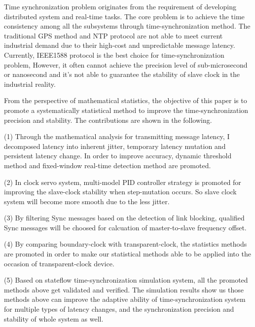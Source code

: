\begin{englishabstract}

Time synchronization problem originates from the requirement of developing distributed system and real-time tasks. The core problem is to achieve the time consistency among all the subsystems through time-synchronization method. The traditional GPS method and NTP protocol are not able to meet current industrial demand due to their high-cost and unpredictable message latency. Currently, IEEE1588 protocol is the best choice for time-synchronization problem, However, it often cannot achieve the precision level of sub-microsecond or nanosecond and it's not able to guarantee the stability of slave clock in the industrial reality.

From the perspective of mathematical statistics, the objective of this paper is to promote a systematically statistical method to improve the time-synchronization precision and stability. The contributions are shown in the following.

(1) Through the mathematical analysis for transmitting message latency, I decomposed latency into inherent jitter, temporary latency mutation and persistent latency change. In order to improve accuracy, dynamic threshold method and fixed-window real-time detection method are promoted.

(2) In clock servo system, multi-model PID controller strategy is promoted for improving the slave-clock stability when step-mutation occurs. So slave clock system will become more smooth due to the less jitter.

(3) By filtering Sync messages based on the detection of link blocking, qualified Sync messages will be choosed for calcuation of master-to-slave frequency offset.

(4) By comparing boundary-clock with transparent-clock, the statistics methods are promoted in order to make our statistical methods able to be applied into the occasion of transparent-clock device.

(5) Based on stateflow time-synchronization simulation system, all the promoted methods above get validated and verified. The simulation results show us those methods above can improve the adaptive ability of time-synchronization system for multiple types of latency changes, and the synchronization precision and stability of whole system as well.

\end{englishabstract}

